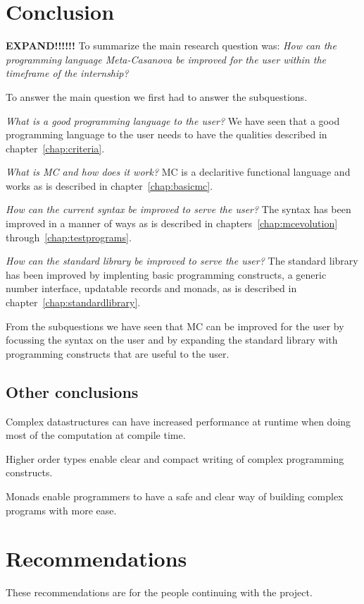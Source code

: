 \chapter{Conclusion}
\textbf{EXPAND!!!!!!}
To summarize the main research question was:
\emph{How can the programming language Meta-Casanova be improved for the user within the timeframe of the internship?}

To answer the main question we first had to answer the subquestions.

\emph{What is a good programming language to the user?}
We have seen that a good programming language to the user needs to have the qualities described in chapter~\ref{chap:criteria}.

\emph{What is MC and how does it work?}
MC is a declaritive functional language and works as is described in chapter~\ref{chap:basicmc}.

\emph{How can the current syntax be improved to serve the user?}
The syntax has been improved in a manner of ways as is described in chapters~\ref{chap:mcevolution} through~\ref{chap:testprograms}.

\emph{How can the standard library be improved to serve the user?}
The standard library has been improved by implenting basic programming constructs, a generic number interface, updatable records and monads, as is described in chapter~\ref{chap:standardlibrary}.

From the subquestions we have seen that MC can be improved for the user by focussing the syntax on the user and by expanding the standard library with programming constructs that are useful to the user.

\section{Other conclusions}
Complex datastructures can have increased performance at runtime when doing most of the computation at compile time.

Higher order types enable clear and compact writing of complex programming constructs.

Monads enable programmers to have a safe and clear way of building complex programs with more ease.



\chapter{Recommendations}
These recommendations are for the people continuing with the project.

